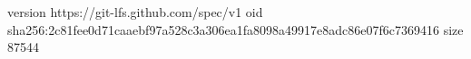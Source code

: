 version https://git-lfs.github.com/spec/v1
oid sha256:2c81fee0d71caaebf97a528c3a306ea1fa8098a49917e8adc86e07f6c7369416
size 87544
